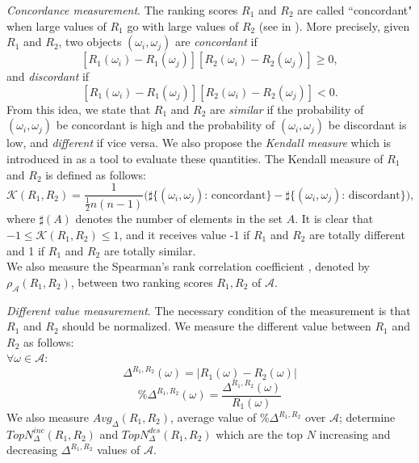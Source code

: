 \documentclass[10pt,leqno,twoside]{article}
\begin{document}
\textit{Concordance measurement}. The ranking scores $R_1$ and $R_2$ are called ``concordant" when large values of $R_1$ go with large values of $R_2$ (see in \cite{Nelsen2006}). More precisely, given $R_1$ and $R_2$, two objects $(\omega_i , \omega_j)$ are \emph{concordant} if
\[[R_1(\omega_i)-R_1(\omega_j)][R_2(\omega_i)-R_2(\omega_j)] \geqslant 0,\]
and \emph{discordant} if
\[[R_1(\omega_i)-R_1(\omega_j)][R_2(\omega_i)-R_2(\omega_j)] < 0.\]
From this idea, we state that $R_1$ and $R_2$ are \emph{similar} if the probability of $(\omega_i,\omega_j)$ be concordant is high and the probability of $(\omega_i,\omega_j)$ be discordant is low, and \emph{different} if vice versa. We also propose the \emph{Kendall measure} which is introduced in \cite{Kendall1938} as a tool to evaluate these quantities. The Kendall measure of $R_1$ and $R_2$ is defined as follows:
\begin{equation}
\mathcal{K}(R_1,R_2) = \frac{1}{\frac{1}{2}n(n-1)}\Big(\sharp\big\{(\omega_i,\omega_j) \text{: concordant}\big\} - \sharp\big\{(\omega_i,\omega_j) \text{: discordant}\big\}\Big),
\end{equation}
where $\sharp(A)$ denotes the number of elements in the set $A$. It is clear that $-1 \leqslant \mathcal{K}(R_1,R_2) \leqslant 1$, and it receives value -1 if $R_1$ and $R_2$ are totally different and 1 if $R_1$ and $R_2$ are totally similar. 
\\
We also measure the Spearman's rank correlation coefficient \cite{spearman}, denoted by $\rho_\mathcal{A}(R_1,R_2)$, between two ranking scores $R_1,R_2$ of $\mathcal{A}$.

\textit{Different value measurement}. The necessary condition of the measurement is that $R_1$ and $R_2$ should be normalized. We measure the different value between $R_1$ and $R_2$ as follows:\\
$\forall \omega \in \mathcal{A}:$
\begin{equation}
 \Delta^{R_1,R_2}(\omega)= |R_1(\omega) - R_2(\omega)|
\end{equation}
 \begin{equation}
 \%\Delta^{R_1,R_2}(\omega)= \frac{\Delta^{R_1,R_2}(\omega)}{R_1(\omega)}
\end{equation}
We also measure $Avg_{\Delta}(R_1,R_2)$, average value of $\%\Delta^{R_1,R_2}$ over $\mathcal{A}$; determine $TopN^{inc}_{\Delta}(R_1,R_2)$ and $TopN^{des}_{\Delta}(R_1,R_2)$  which are the top $N$  increasing and decreasing  $\Delta^{R_1,R_2}$ values of $\mathcal{A}$.
\end{document}
